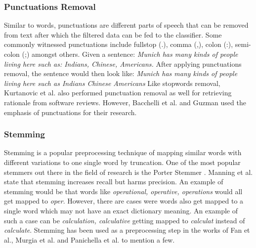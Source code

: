 \documentclass[a4paper,12pt,twoside]{report}
\begin{document}
\subsubsection{Punctuations Removal}
Similar to words, punctuations are different parts of speech that can be removed from text after which the filtered data can be fed to the classifier. Some commonly witnessed punctuations include fullstop (.), comma (,), colon (:), semi-colon (;) amongst others. 
\newline \newline
Given a sentence: \textit{Munich has many kinds of people living here such as: Indians, Chinese, Americans.}
\newline \newline
After applying punctuations removal, the sentence would then look like: \textit{Munich has many kinds of people living here such as Indians Chinese Americans}
\newline \newline
Like stopwords removal, Kurtanovic et al.\cite{Kurtanovic2017} also performed punctuation removal as well for retrieving rationale from software reviews. However, Bacchelli et al.\cite{Bacchelli2012} and Guzman\cite{Guzman2015} used the emphasis of punctuations for their research. 

\subsubsection{Stemming}
Stemming is a popular preprocessing technique of mapping similar words with different variations to one single word by truncation. One of the most popular stemmers out there in the field of research is the Porter Stemmer \cite{Porter}. Manning et al.\cite{Manning2009} state that stemming increases recall but harms precision. An example of stemming would be that words like \textit{operational, operative, operations} would all get mapped to \textit{oper}. However, there are cases were words also get mapped to a single word which may not have an exact dictionary meaning. An example of such a case can be \textit{calculation, calculative} getting mapped to \textit{calculat} instead of \textit{calculate}\cite{Toman2006}. Stemming has been used as a preprocessing step in the works of Fan et al.\cite{Fan2017}, Murgia et al.\cite{Murgia2016} and Panichella et al.\cite{Panichella2014a} to mention a few.
\end{document}
